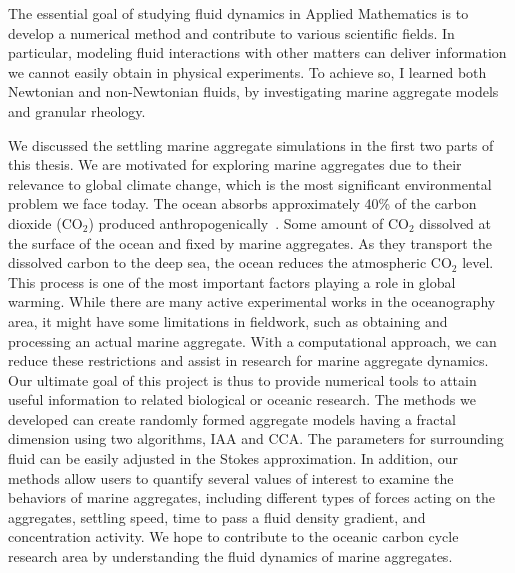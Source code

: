 The essential goal of studying fluid dynamics in Applied Mathematics is to develop a numerical method and contribute to various scientific fields. In particular, modeling fluid interactions with other matters can deliver information we cannot easily obtain in physical experiments. To achieve so, I learned both Newtonian and non-Newtonian fluids, by investigating marine aggregate models and granular rheology.
\par
We discussed the settling marine aggregate simulations in the first two parts of this thesis. 
We are motivated for exploring marine aggregates due to their relevance to global climate change, which is the most significant environmental problem we face today.
The ocean absorbs approximately 40\% of the carbon dioxide (CO$_2$) produced anthropogenically~\cite{omand_sinking_2020}. 
Some amount of CO$_2$ dissolved at the surface of the ocean and fixed by marine aggregates. As they transport the dissolved carbon to the deep sea, the ocean reduces the atmospheric CO$_2$ level. 
This process is one of the most important factors playing a role in global warming.
While there are many active experimental works in the oceanography area, it might have some limitations in fieldwork, such as obtaining and processing an actual marine aggregate. 
With a computational approach, we can reduce these restrictions and assist in research for marine aggregate dynamics. 
Our ultimate goal of this project is thus to provide numerical tools to attain useful information to related biological or oceanic research.
The methods we developed can create randomly formed aggregate models having a fractal dimension using two algorithms, IAA and CCA. The parameters for surrounding fluid can be easily adjusted in the Stokes approximation. 
In addition, our methods allow users to quantify several values of interest to examine the behaviors of marine aggregates, including different types of forces acting on the aggregates, settling speed, time to pass a fluid density gradient, and concentration activity.
We hope to contribute to the oceanic carbon cycle research area by understanding the fluid dynamics of marine aggregates. 


